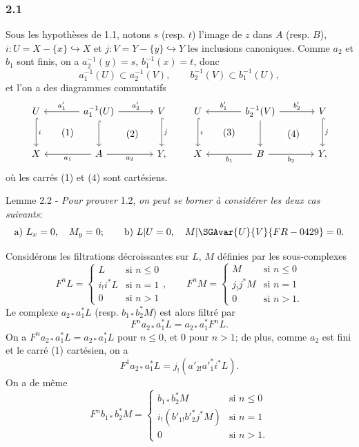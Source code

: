 \subsubsection*{2.1}
Sous les hypothèses de 1.1, notons $s$ (resp. $t$) l'image de $z$ dans $A$ (resp. $B$), $i:U=X-\{x\}\hookrightarrow X$ et $j:V=Y-\{y\}\hookrightarrow Y$ les inclusions canoniques. Comme $a_2$ et $b_1$ sont finis, on a $a_2^{-1}(y)=s$, $b_1^{-1}(x)=t$, donc
\[
a_1^{-1}(U)\subset a_2^{-1}(V),\qquad b_2^{-1}(V)\subset b_1^{-1}(U),
\]
et l'on a des diagrammes commutatifs
\[
\begin{tikzcd}[column sep=large,row sep=large]
U \arrow[d,hook,"i"] \arrow[rd,phantom,"(1)"{description}] & a_1^{-1}(U) \arrow[l,"a'_1"'] \arrow[r,"a'_2"] \arrow[d,hook] \arrow[rd,phantom,"(2)"{description}] & V \arrow[d,hook,"j"]\\
X & A \arrow[l,"a_1"] \arrow[r,"a_2"'] & Y ,
\end{tikzcd}
\qquad
\begin{tikzcd}[column sep=large,row sep=large]
U \arrow[d,hook,"i"] \arrow[rd,phantom,"(3)"{description}] & b_2^{-1}(V) \arrow[l,"b'_1"'] \arrow[r,"b'_2"] \arrow[d] \arrow[rd,phantom,"(4)"{description}] & V \arrow[d,hook,"j"]\\
X & B \arrow[l,"b_1"] \arrow[r,"b_2"'] & Y ,
\end{tikzcd}
\]
où les carrés (1) et (4) sont cartésiens.

\begin{statement}{Lemme 2.2 -}
\emph{Pour prouver} 1.2, \emph{on peut se borner à considérer les deux cas suivants}:
\[
\text{a) } L_x=0,\quad M_y=0;\qquad
\text{b) } L|U=0,\quad M|\SGAvar{U}{V}{FR-0429}=0 .
\]
\end{statement}

Considérons les filtrations décroissantes sur $L$, $M$ définies par les sous-complexes
\[
F^nL=
\begin{cases}
L & \text{si } n\le 0\\
i_!i^*L & \text{si } n=1\\
0 & \text{si } n>1
\end{cases}
,\qquad
F^nM=
\begin{cases}
M & \text{si } n\le 0\\
j_!j^*M & \text{si } n=1\\
0 & \text{si } n>1.
\end{cases}
\]
Le complexe $a_{2*}a_1^*L$ (resp. $b_{1*}b_2^*M$) est alors filtré par
\[
F^n a_{2*}a_1^*L=a_{2*}a_1^*F^nL.
\]
On a $F^n a_{2*}a_1^*L=a_{2*}a_1^*L$ pour $n\le 0$, et $0$ pour $n>1$; de plus, comme $a_2$ est fini et le carré (1) cartésien, on a
\[
F^1a_{2*}a_1^*L=j_!(a'_{2!}a'^*_1i^*L).
\]
On a de même
\[
F^n b_{1*}b_2^*M=
\begin{cases}
b_{1*}b_2^*M & \text{si } n\le 0\\
i_!(b'_{1!}b'^*_2j^*M) & \text{si } n=1\\
0 & \text{si } n>1.
\end{cases}
\]

